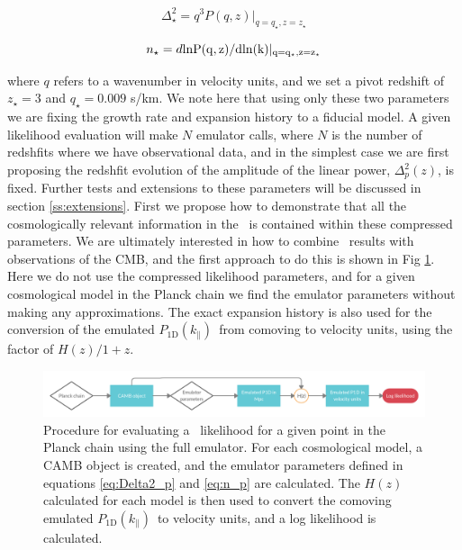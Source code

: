 \documentclass[preprintnumbers,prd,superscriptaddress,notitlepage,nofootinbib] {revtex4-1}
\newcommand{\fluxpower}{$P_\mathrm{1D}(k_\parallel)$}
\begin{document}
\begin{equation}
    \label{eq:Delta2_star}
    \Delta^2_\star=q^3P(q, z)|_{q=q_\star,z=z_\star}
\end{equation}

\begin{equation}
    \label{eq:n_star}
    n_\star=d\rm{ln}P(q,z) / d \rm{ln}(k)|_{q=q_\star,z=z_\star}
\end{equation}

where $q$ refers to a wavenumber in velocity units, and we set a pivot
redshift of $z_\star=3$ and $q_\star=0.009$ s/km. We note here that using
only these two parameters we are fixing the growth rate and expansion
history to a fiducial model. A given likelihood evaluation will make $N$ emulator
calls, where $N$ is the number of redshfits where we have observational data, and
in the simplest case we are first proposing the redshfit evolution of the amplitude
of the linear power, $\Delta^2_p(z)$, is fixed.
Further tests and extensions to these
parameters will be discussed in section \ref{ss:extensions}. First we
propose how to demonstrate that all the cosmologically relevant information
in the \lyaf\ is contained within these compressed parameters. We are ultimately
interested in how to combine \lyaf\ results with observations of the CMB, and the
first approach to do this is shown in Fig \ref{fig:param_map1}. Here we do not use
the compressed likelihood parameters, and for a given cosmological model in the Planck
chain we find the emulator parameters without making any approximations. The exact
expansion history is also used for the conversion of the emulated \fluxpower\ from
comoving to velocity units, using the factor of $H(z)/1+z$.

\begin{figure}[ht]
    \begin{center}
     \includegraphics[scale=0.2]{Figures/Parameter_mapping.png}
    \end{center}
    \caption{Procedure for evaluating a \lyaf\ likelihood for a given
    point in the Planck chain using the full emulator. For each cosmological
    model, a \textsc{CAMB} object is created, and the emulator parameters defined
    in equations \ref{eq:Delta2_p} and \ref{eq:n_p} are calculated. The $H(z)$ calculated
    for each model is then used to convert the comoving emulated \fluxpower\
    to velocity units, and a log likelihood is calculated.}
    \label{fig:param_map1}
\end{figure}
\end{document}
